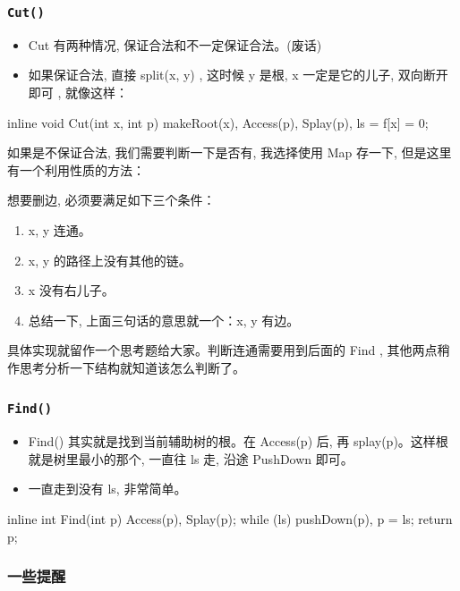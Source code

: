 \subsubsection{\texttt{Cut()}}

\begin{itemize}
\item Cut 有两种情况, 保证合法和不一定保证合法。(废话)
\item 如果保证合法, 直接 split(x, y) , 这时候 y 是根, x 一定是它的儿子, 双向断开即可 , 就像这样：
\end{itemize}

\begin{cppcode}
inline void Cut(int x, int p) {
  makeRoot(x), Access(p), Splay(p), ls = f[x] = 0;
}
\end{cppcode}

如果是不保证合法, 我们需要判断一下是否有, 我选择使用 Map 存一下, 但是这里有一个利用性质的方法：

想要删边, 必须要满足如下三个条件：

\begin{enumerate}
\item x, y 连通。
\item x, y 的路径上没有其他的链。
\item x 没有右儿子。
\item 总结一下, 上面三句话的意思就一个：x, y 有边。
\end{enumerate}

具体实现就留作一个思考题给大家。判断连通需要用到后面的 Find , 其他两点稍作思考分析一下结构就知道该怎么判断了。

\subsubsection{\texttt{Find()}}

\begin{itemize}
\item Find() 其实就是找到当前辅助树的根。在 Access(p) 后, 再 splay(p)。这样根就是树里最小的那个, 一直往 ls 走, 沿途 PushDown 即可。
\item 一直走到没有 ls, 非常简单。
\end{itemize}

\begin{cppcode}
inline int Find(int p) {
  Access(p), Splay(p);
  while (ls) pushDown(p), p = ls;
  return p;
}
\end{cppcode}

\subsubsection{一些提醒}

